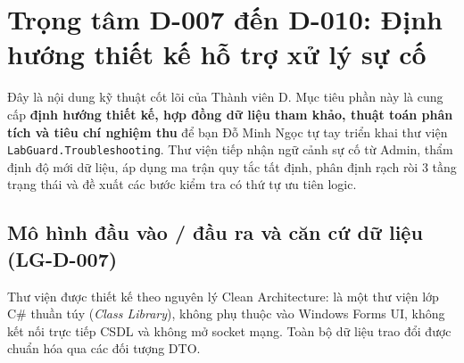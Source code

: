 \documentclass[12pt,a4paper]{article}
\begin{document}
\section{Trọng tâm D-007 đến D-010: Định hướng thiết kế hỗ trợ xử lý sự cố}

\begin{summarybox}
Đây là nội dung kỹ thuật cốt lõi của Thành viên D. Mục tiêu phần này là cung cấp \textbf{định hướng thiết kế, hợp đồng dữ liệu tham khảo, thuật toán phân tích và tiêu chí nghiệm thu} để bạn Đỗ Minh Ngọc tự tay triển khai thư viện \texttt{LabGuard.Troubleshooting}. Thư viện tiếp nhận ngữ cảnh sự cố từ Admin, thẩm định độ mới dữ liệu, áp dụng ma trận quy tắc tất định, phân định rạch ròi 3 tầng trạng thái và đề xuất các bước kiểm tra có thứ tự ưu tiên logic.
\end{summarybox}

\subsection{Mô hình đầu vào / đầu ra và căn cứ dữ liệu (LG-D-007)}
Thư viện được thiết kế theo nguyên lý Clean Architecture: là một thư viện lớp C\# thuần túy (\textit{Class Library}), không phụ thuộc vào Windows Forms UI, không kết nối trực tiếp CSDL và không mở socket mạng. Toàn bộ dữ liệu trao đổi được chuẩn hóa qua các đối tượng DTO.
\end{document}
